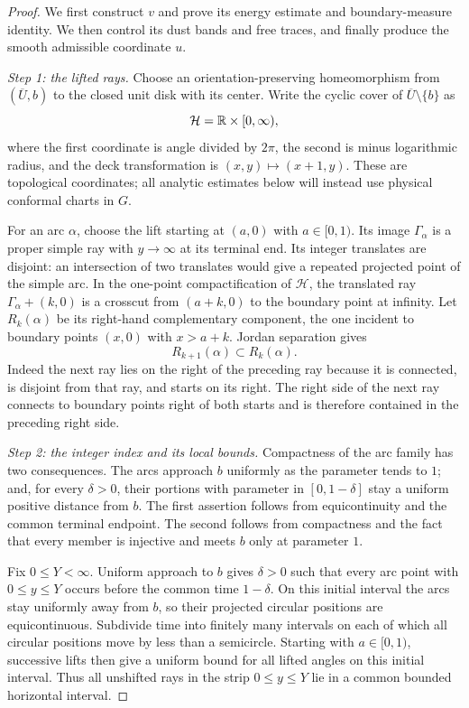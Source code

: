 \begin{proof}
We first construct $v$ and prove its energy estimate and boundary-measure
identity.  We then control its dust bands and free traces, and finally
produce the smooth admissible coordinate $u$.

\smallskip\noindent\emph{Step 1: the lifted rays.}
Choose an orientation-preserving homeomorphism from
$(\overline U,b)$ to the closed unit disk with its center.  Write the
cyclic cover of $\overline U\setminus\{b\}$ as
\[
 \mathcal H=\mathbb R\times[0,\infty),
\]
where the first coordinate is angle divided by $2\pi$, the second is
minus logarithmic radius, and the deck transformation is
$(x,y)\mapsto(x+1,y)$.  These are topological coordinates; all analytic
estimates below will instead use physical conformal charts in $G$.

For an arc $\alpha$, choose the lift starting at $(a,0)$ with
$a\in[0,1)$.  Its image $\Gamma_\alpha$ is a proper simple ray with
$y\to\infty$ at its terminal end.  Its integer translates are disjoint:
an intersection of two translates would give a repeated projected
point of the simple arc.  In the one-point compactification of
$\mathcal H$, the translated ray $\Gamma_\alpha+(k,0)$ is a crosscut
from $(a+k,0)$ to the boundary point at infinity.  Let $R_k(\alpha)$
be its right-hand complementary component, the one incident to boundary
points $(x,0)$ with $x>a+k$.
Jordan separation gives
\[
 R_{k+1}(\alpha)\subset R_k(\alpha).
\]
Indeed the next ray lies on the right of the preceding ray because it
is connected, is disjoint from that ray, and starts on its right.
The right side of the next ray connects to boundary points right of
both starts and is therefore contained in the preceding right side.

\smallskip\noindent\emph{Step 2: the integer index and its local bounds.}
Compactness of the arc family has two consequences.  The arcs approach
$b$ uniformly as the parameter tends to $1$; and, for every
$\delta>0$, their portions with parameter in $[0,1-\delta]$ stay a
uniform positive distance from $b$.  The first assertion follows from
equicontinuity and the common terminal endpoint.  The second follows
from compactness and the fact that every member is injective and meets
$b$ only at parameter $1$.

Fix $0\le Y<\infty$.  Uniform approach to $b$ gives $\delta>0$ such that
every arc point with $0\le y\le Y$ occurs before the common time
$1-\delta$.  On this initial interval the arcs stay uniformly away
from $b$, so their projected circular positions are equicontinuous.
Subdivide time into finitely many intervals on each of which all circular positions
move by less than a semicircle.  Starting with $a\in[0,1)$, successive
lifts then give a uniform bound for all lifted angles on this initial
interval.  Thus all unshifted rays in the strip $0\le y\le Y$ lie
in a common bounded horizontal interval.


\end{proof}
